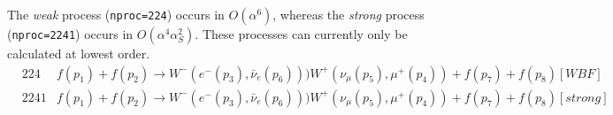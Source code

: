 The {\it weak} process ({\tt nproc=224}) occurs in $O(\alpha^6)$, 
whereas the {\it strong} process ({\tt nproc=2241}) occurs in $O(\alpha^4 \alpha_S^2)$.
These processes can currently only be calculated at lowest order.
\begin{eqnarray}
&224   & f(p_1)+f(p_2) \to W^-(e^-(p_3),\bar{\nu}_e(p_6)))W^+(\nu_\mu(p_5),\mu^+(p_4))+f(p_7)+f(p_8) [WBF]    \nonumber
\\
&2241  & f(p_1)+f(p_2) \to W^-(e^-(p_3),\bar{\nu}_e(p_6)))W^+(\nu_\mu(p_5),\mu^+(p_4))+f(p_7)+f(p_8) [strong]
\nonumber
\end{eqnarray}
